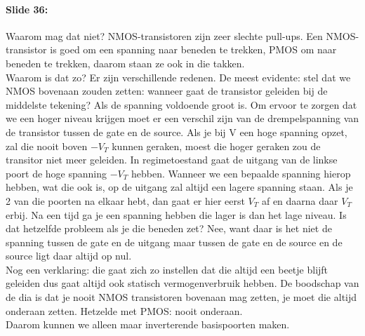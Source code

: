 \documentclass[10pt,a4paper]{book}
\begin{document}
\paragraph{Slide 36:} Waarom mag dat niet? NMOS-transistoren zijn zeer slechte pull-ups. Een NMOS-transistor is goed om een spanning naar beneden te trekken, PMOS om naar beneden te trekken, daarom staan ze ook in die takken.\\
Waarom is dat zo? Er zijn verschillende redenen. De meest evidente: stel dat we NMOS bovenaan zouden zetten: wanneer gaat de transistor geleiden bij de middelste tekening? Als de spanning voldoende groot is. Om ervoor te zorgen dat we een hoger niveau krijgen moet er een verschil zijn van de drempelspanning van de transistor tussen de gate en de source. Als je bij V een hoge spanning opzet, zal die nooit boven $-V_T$ kunnen geraken, moest die hoger geraken zou de transitor niet meer geleiden. In regimetoestand gaat de uitgang van de linkse poort de hoge spanning $-V_T$ hebben. Wanneer we een bepaalde spanning hierop hebben, wat die ook is, op de uitgang zal altijd een lagere spanning staan. Als je 2 van die poorten na elkaar hebt, dan gaat er hier eerst $V_T$ af en daarna daar $V_T$ erbij. Na een tijd ga je een spanning hebben die lager is dan het lage niveau. Is dat hetzelfde probleem als je die beneden zet? Nee, want daar is het niet de spanning tussen de gate en de uitgang maar tussen de gate en de source en de source ligt daar altijd op nul. \\
Nog een verklaring: die gaat zich zo instellen dat die altijd een beetje blijft geleiden dus gaat altijd ook statisch vermogenverbruik hebben. De boodschap van de dia is dat je nooit NMOS transistoren bovenaan mag zetten, je moet die altijd onderaan zetten. Hetzelde met PMOS: nooit onderaan.\\
Daarom kunnen we alleen maar inverterende basispoorten maken.
\end{document}

